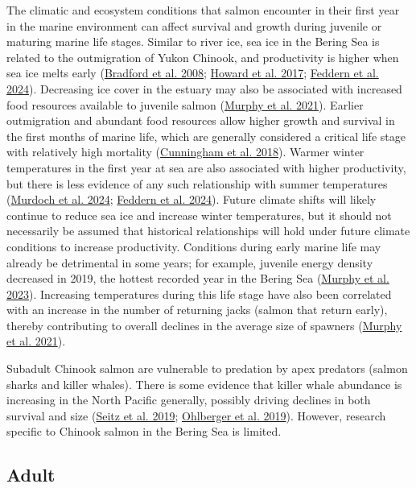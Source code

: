 \documentclass[11pt]{book}
\begin{document}
The climatic and ecosystem conditions that salmon encounter in their first year in the marine environment can affect survival and growth during juvenile or maturing marine life stages. Similar to river ice, sea ice in the Bering Sea is related to the outmigration of Yukon Chinook, and productivity is higher when sea ice melts early (\protect\hyperlink{ref-bradford2008}{Bradford et al. 2008}; \protect\hyperlink{ref-howard2017}{Howard et al. 2017}; \protect\hyperlink{ref-feddern2024}{Feddern et al. 2024}). Decreasing ice cover in the estuary may also be associated with increased food resources available to juvenile salmon (\protect\hyperlink{ref-murphy2021}{Murphy et al. 2021}). Earlier outmigration and abundant food resources allow higher growth and survival in the first months of marine life, which are generally considered a critical life stage with relatively high mortality (\protect\hyperlink{ref-cunningham2018}{Cunningham et al. 2018}). Warmer winter temperatures in the first year at sea are also associated with higher productivity, but there is less evidence of any such relationship with summer temperatures (\protect\hyperlink{ref-murdoch2024}{Murdoch et al. 2024}; \protect\hyperlink{ref-feddern2024}{Feddern et al. 2024}). Future climate shifts will likely continue to reduce sea ice and increase winter temperatures, but it should not necessarily be assumed that historical relationships will hold under future climate conditions to increase productivity. Conditions during early marine life may already be detrimental in some years; for example, juvenile energy density decreased in 2019, the hottest recorded year in the Bering Sea (\protect\hyperlink{ref-murphy2023}{Murphy et al. 2023}). Increasing temperatures during this life stage have also been correlated with an increase in the number of returning jacks (salmon that return early), thereby contributing to overall declines in the average size of spawners (\protect\hyperlink{ref-murphy2021}{Murphy et al. 2021}).

Subadult Chinook salmon are vulnerable to predation by apex predators (salmon sharks and killer whales). There is some evidence that killer whale abundance is increasing in the North Pacific generally, possibly driving declines in both survival and size (\protect\hyperlink{ref-seitz2019}{Seitz et al. 2019}; \protect\hyperlink{ref-ohlberger2019}{Ohlberger et al. 2019}). However, research specific to Chinook salmon in the Bering Sea is limited.

\hypertarget{adult}{%
\subsection{Adult}\label{adult}}
\end{document}
